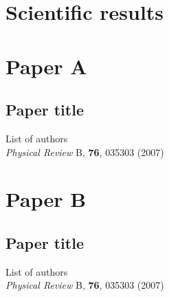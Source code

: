 \chapter{Scientific results}


\chapter*{Paper A}
\section{Paper title}

\noindent List of authors\\

\noindent \textit{Physical Review} B, \textbf{76}, 035303 (2007)
\cleardoublepage



\chapter*{Paper B}
\section{Paper title}

\noindent List of authors\\

\noindent \textit{Physical Review} B, \textbf{76}, 035303 (2007)
\cleardoublepage




